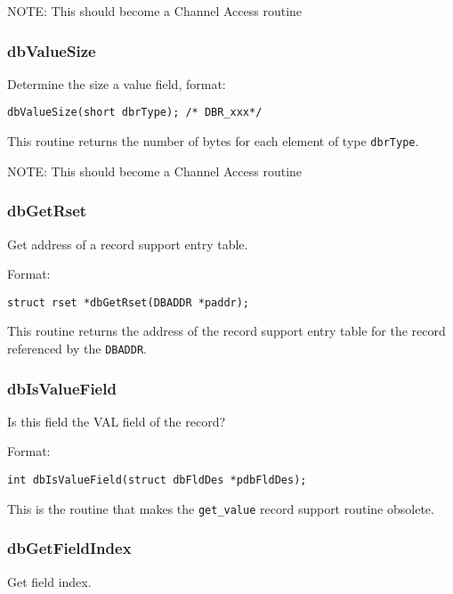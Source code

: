 NOTE: This should become a Channel Access routine

\subsubsection{dbValueSize}

Determine the size a value field, format:

\begin{verbatim}
dbValueSize(short dbrType); /* DBR_xxx*/
\end{verbatim}

This routine returns the number of bytes for each element of type \verb|dbrType|.

NOTE: This should become a Channel Access routine

\subsubsection{dbGetRset}

Get address of a record support entry table.

Format:

\begin{verbatim}
struct rset *dbGetRset(DBADDR *paddr);
\end{verbatim}

This routine returns the address of the record support entry table for the record referenced by the \verb|DBADDR|.

\subsubsection{dbIsValueField}

Is this field the VAL field of the record?

Format:

\begin{verbatim}
int dbIsValueField(struct dbFldDes *pdbFldDes);
\end{verbatim}

This is the routine that makes the \verb|get_value| record support routine obsolete.

\subsubsection{dbGetFieldIndex}

Get field index.

